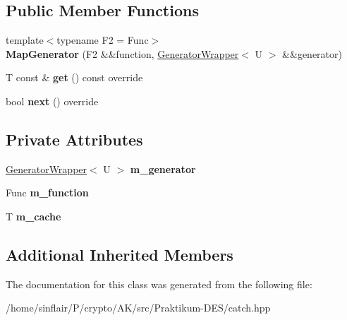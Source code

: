 \subsection*{Public Member Functions}
\begin{DoxyCompactItemize}
\item 
\mbox{\label{classCatch_1_1Generators_1_1MapGenerator_a525c7eaf53ad220ee7add534aff2522c}} 
{\footnotesize template$<$typename F2  = Func$>$ }\\{\bfseries Map\+Generator} (F2 \&\&function, \hyperlink{classCatch_1_1Generators_1_1GeneratorWrapper}{Generator\+Wrapper}$<$ U $>$ \&\&generator)
\item 
\mbox{\label{classCatch_1_1Generators_1_1MapGenerator_a199d377afba00519f202c59b4b488235}} 
T const  \& {\bfseries get} () const override
\item 
\mbox{\label{classCatch_1_1Generators_1_1MapGenerator_aa07e2f12d38ae060c30cc30d9dc236c5}} 
bool {\bfseries next} () override
\end{DoxyCompactItemize}
\subsection*{Private Attributes}
\begin{DoxyCompactItemize}
\item 
\mbox{\label{classCatch_1_1Generators_1_1MapGenerator_a7a4c986b7721df82559d5c3cbb3bdb66}} 
\hyperlink{classCatch_1_1Generators_1_1GeneratorWrapper}{Generator\+Wrapper}$<$ U $>$ {\bfseries m\+\_\+generator}
\item 
\mbox{\label{classCatch_1_1Generators_1_1MapGenerator_add8fa24bfa56705c798fe70f4c6235ff}} 
Func {\bfseries m\+\_\+function}
\item 
\mbox{\label{classCatch_1_1Generators_1_1MapGenerator_a970d45e8dccf903d3539daada255da42}} 
T {\bfseries m\+\_\+cache}
\end{DoxyCompactItemize}
\subsection*{Additional Inherited Members}


The documentation for this class was generated from the following file\+:\begin{DoxyCompactItemize}
\item 
/home/sinflair/\+P/crypto/\+A\+K/src/\+Praktikum-\/\+D\+E\+S/catch.\+hpp\end{DoxyCompactItemize}
